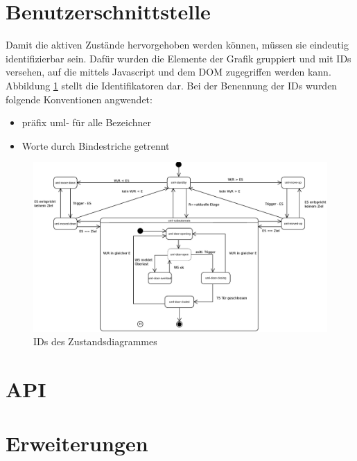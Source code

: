\section{Benutzerschnittstelle}
Damit die aktiven Zustände hervorgehoben werden können, müssen sie eindeutig identifizierbar sein.
Dafür wurden die Elemente der Grafik gruppiert und mit IDs versehen, auf die mittels Javascript und dem \acrshort{DOM} zugegriffen werden kann.
Abbildung \ref{fig:ZD_id_view} stellt die Identifikatoren dar.
Bei der Benennung der IDs wurden folgende Konventionen angwendet:
\begin{itemize}
	\item präfix uml- für alle Bezeichner
	\item Worte durch Bindestriche getrennt
\end{itemize}

\begin{figure}[hbt]
	\centering
	\includegraphics[width=\textwidth]{images/ZDv6_id_view.eps}
	\caption{IDs des Zustandsdiagrammes}%
	\label{fig:ZD_id_view}%
\end{figure}

\section{API}
\label{imp_api}

\section{Erweiterungen}
